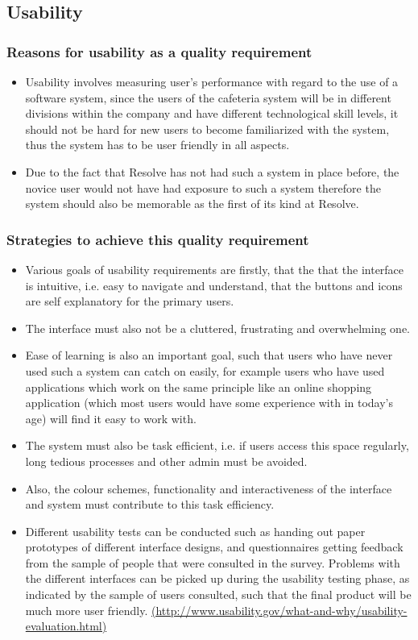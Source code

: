 \documentclass[a4paper,12pt]{article}
\begin{document}
\subsection{Usability}

 \subsubsection{Reasons for  usability as a quality requirement}
 \begin{itemize}
 \item Usability involves measuring user's performance with regard to the use of a software system, since the users of the cafeteria system will be in different divisions within the company and have different technological skill levels, it should not be hard for new users to become familiarized with the system, thus the system has to be user friendly in all aspects.
 \item Due to the fact that Resolve has not had such a system in place before, the novice user would not have had exposure to such a system therefore the system should also be memorable as the first of its kind at Resolve.  

 \end{itemize}
 \subsubsection{Strategies to achieve this quality requirement}
 \begin{itemize}
 \item Various goals of usability requirements are firstly, that the that the interface is intuitive, i.e. easy to navigate and understand, that the buttons and icons are self explanatory for the primary users.
 \item The interface must also not be a cluttered, frustrating and overwhelming one. 
 \item Ease of learning is also an important goal, such that users who have never used such a system can catch on easily, for example users who have used applications which work on the same principle like an online shopping application (which most users would have some experience with in today's age) will find it easy to work with.
 \item The system must also be task efficient, i.e. if users access this space regularly, long tedious processes and other admin must be avoided.
\item Also, the colour schemes, functionality and interactiveness of the interface and system must contribute to this task efficiency. 
\item Different usability tests can be conducted such as handing out paper prototypes of different interface designs, and questionnaires getting feedback from the sample of people that were consulted in the survey. Problems with the different interfaces can be picked up during the usability testing phase, as indicated by the sample of users consulted, such that the final product will be much more user friendly. \url{(http://www.usability.gov/what-and-why/usability-evaluation.html)}

 \end{itemize}
\end{document}
